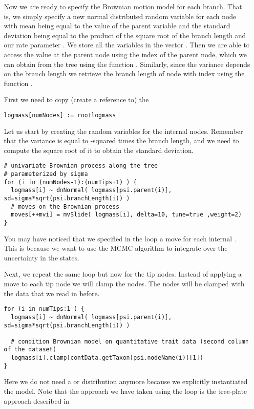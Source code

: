 Now we are ready to specify the Brownian motion model for each branch.
That is, we simply specify a new normal distributed random variable for each node with mean being equal to the value of the parent variable and the standard deviation being equal to the product of the square root of the branch length and our rate parameter . We store all the variables in the vector . Then we are able to access the value at the parent node using the index of the parent node, which we can obtain from the tree using the function . Similarly, since the variance depends on the branch length we retrieve the branch length of node with index  using the function .

First we need to copy (create a reference to) the 
{\tt \small \begin{snugshade*}
\begin{lstlisting}
logmass[numNodes] := rootlogmass
\end{lstlisting}
\end{snugshade*}}
Let us start by creating the random variables for the internal nodes. Remember that the variance is equal to -squared times the branch length, and we need to compute the square root of it to obtain the standard deviation.
{\tt \small \begin{snugshade*}
\begin{lstlisting}
# univariate Brownian process along the tree
# parameterized by sigma
for (i in (numNodes-1):(numTips+1) ) {
  logmass[i] ~ dnNormal( logmass[psi.parent(i)], sd=sigma*sqrt(psi.branchLength(i)) )
  # moves on the Brownian process
  moves[++mvi] = mvSlide( logmass[i], delta=10, tune=true ,weight=2) 
}
\end{lstlisting}
\end{snugshade*}}
You may have noticed that we specified in the loop a move for each internal . This is because we want to use the MCMC algorithm to integrate over the uncertainty in the states.

Next, we repeat the same loop but now for the tip nodes. Instead of applying a move to each tip node we will clamp the nodes. The nodes will be clamped with the data that we read in before.
{\tt \small \begin{snugshade*}
\begin{lstlisting}
for (i in numTips:1 ) {
  logmass[i] ~ dnNormal( logmass[psi.parent(i)], sd=sigma*sqrt(psi.branchLength(i)) )

  # condition Brownian model on quantitative trait data (second column of the dataset)
  logmass[i].clamp(contData.getTaxon(psi.nodeName(i))[1])
}
\end{lstlisting}
\end{snugshade*}}
Here we do not need a  or  distribution anymore because we explicitly instantiated the model. Note that the approach we have taken using the loop is the tree-plate approach described in \citep{Hohna2014b}

